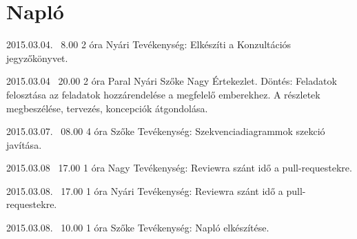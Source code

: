 %
\section{Napló}

\begin{naplo}
	
	\bejegyzes
	{2015.03.04. ~8.00}
	{2 óra}
	{Nyári} 
	{Tevékenység: Elkészíti a Konzultációs jegyzőkönyvet.\newline } 
	
	
	\bejegyzes
	{2015.03.04 ~20.00}
	{2 óra}
	{Paral \newline Nyári \newline Szőke \newline Nagy} 
	{Értekezlet.
		Döntés: Feladatok felosztása az feladatok hozzárendelése a megfelelő emberekhez. A részletek megbeszélése, tervezés, koncepciók átgondolása.\newline } 
			
	
	\bejegyzes
	{2015.03.07. ~08.00}
	{4 óra}
	{Szőke} 
	{Tevékenység: Szekvenciadiagrammok szekció javítása.\newline } 
		
	\bejegyzes
	{2015.03.08 ~17.00}
	{1 óra}
	{Nagy} 
	{Tevékenység: Reviewra szánt idő a pull-requestekre.\newline } 
	
	\bejegyzes
	{2015.03.08. ~17.00}
	{1 óra}
	{Nyári} 
	{Tevékenység: Reviewra szánt idő a pull-requestekre.\newline } 
			
	\bejegyzes
	{2015.03.08. ~10.00}
	{1 óra}
	{Szőke} 
	{Tevékenység: Napló elkészítése.\newline } 
	
\end{naplo}



